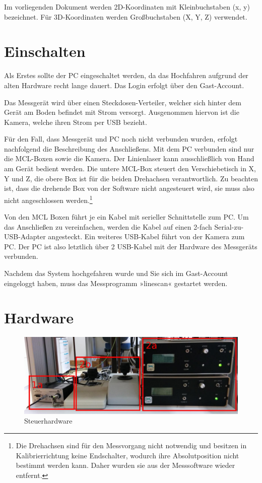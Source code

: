 \documentclass[a4paper,10pt]{scrartcl}
\begin{document}
Im vorliegenden Dokument werden 2D-Koordinaten mit Kleinbuchstaben (x, y) bezeichnet.
Für 3D-Koordinaten werden Großbuchstaben (X, Y, Z) verwendet.

\section{Einschalten}

Als Erstes sollte der PC eingeschaltet werden, da das Hochfahren aufgrund der alten Hardware
recht lange dauert. Das Login erfolgt über den Gast-Account.

Das Messgerät wird über einen Steckdosen-Verteiler, welcher sich hinter dem Gerät am Boden befindet
mit Strom versorgt. Ausgenommen hiervon ist die Kamera, welche ihren Strom per USB bezieht.

Für den Fall, dass Messgerät und PC noch nicht verbunden wurden, erfolgt nachfolgend die Beschreibung
des Anschließens. Mit dem PC verbunden sind nur die MCL-Boxen sowie die Kamera. Der Linienlaser kann
ausschließlich von Hand am Gerät bedient werden. Die untere MCL-Box steuert den Verschiebetisch in X, Y
und Z, die obere Box ist für die beiden Drehachsen verantwortlich. Zu beachten ist, dass die drehende
Box von der Software nicht angesteuert wird, sie muss also nicht angeschlossen werden.\footnote{
Die Drehachsen sind für den Messvorgang nicht notwendig und besitzen in Kalibrierrichtung keine
Endschalter, wodurch ihre Absolutposition nicht bestimmt werden kann. Daher wurden sie aus der
Messsoftware wieder entfernt.}

Von den MCL Boxen führt je ein Kabel mit serieller Schnittstelle zum PC. Um das Anschließen zu
vereinfachen, werden die Kabel auf einen 2-fach Serial-zu-USB-Adapter angesteckt. Ein weiteres
USB-Kabel führt von der Kamera zum PC. Der PC ist also letztlich über 2 USB-Kabel mit der Hardware
des Messgeräts verbunden.

Nachdem das System hochgefahren wurde und Sie sich im Gast-Account eingeloggt haben, muss das
Messprogramm »linescan« gestartet werden.

\section{Hardware}

\begin{figure}[h]
  \centering
  \includegraphics[width=\textwidth]{include/IMG_20160412_140339.jpg}
  \caption{Steuerhardware}
  \label{fig:overview}
\end{figure}
\end{document}
